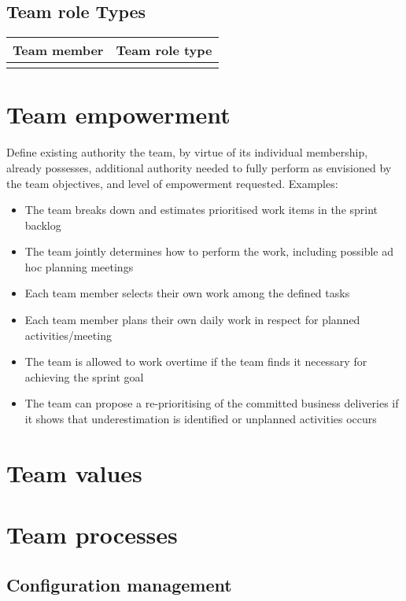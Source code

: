 \documentclass{article}
\begin{document}
\subsection{Team role Types}

\begin{tabel}
    \centering
    \begin{tabular}{l|l}
        \rowcolor{Gray}
        \textbf{Team member} & \textbf{Team role type}\\\hline
                             &
    \end{tabular}
    \label{tab:roleTypes}
\end{tabel}

\section{Team empowerment}
Define existing authority the team, by virtue of its individual membership, already possesses, additional
authority needed to fully perform as envisioned by the team objectives, and level of empowerment requested.
Examples:
\begin{itemize}
    \item The team breaks down and estimates prioritised work items in the sprint backlog
    \item The team jointly determines how to perform the work, including possible ad hoc planning meetings
    \item Each team member selects their own work among the defined tasks
    \item Each team member plans their own daily work in respect for planned activities/meeting
    \item The team is allowed to work overtime if the team finds it necessary for achieving the sprint goal
    \item The team can propose a re-prioritising of the committed business deliveries if it shows that underestimation is identified or unplanned activities occurs
\end{itemize}

\section{Team values}

\section{Team processes}

\subsection{Configuration management}
\end{document}
